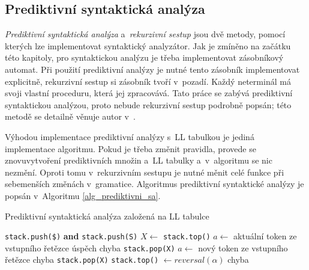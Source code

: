 \subsection*{Prediktivní syntaktická analýza}
\emph{Prediktivní syntaktická analýza} a~\emph{rekurzivní sestup} jsou dvě metody, pomocí kterých lze implementovat syntaktický analyzátor.
Jak je zmíněno na začátku této kapitoly, pro syntaktickou analýzu je třeba implementovat zásobníkový automat.
Při použití prediktivní analýzy je nutné tento zásobník implementovat explicitně, rekurzivní sestup si zásobník tvoří v~pozadí.
Každý neterminál má svoji vlastní proceduru, která jej zpracovává.
Tato práce se zabývá prediktivní syntaktickou analýzou, proto nebude rekurzivní sestup podrobně popsán; této metodě se detailně věnuje autor v~\cite{medunaElementsOfCompDesign}.

Výhodou implementace prediktivní analýzy s~LL tabulkou je jediná implementace algoritmu.
Pokud je třeba změnit pravidla, provede se znovuvytvoření prediktivních množin a~LL tabulky a~v~algoritmu se nic nezmění.
Oproti tomu v~rekurzivním sestupu je nutné měnit celé funkce při sebemenších změnách v~gramatice.
Algoritmus prediktivní syntaktické analýzy je popsán v~Algoritmu \ref{alg_prediktivni_sa}.
\begin{algorithm}[h!]
    \caption{Prediktivní syntaktická analýza založená na LL tabulce}
    \label{alg_prediktivni_sa}
    \begin{algorithmic}[1]
        \NewLine
        \State \texttt{stack.push(\$)} \textbf{and} \texttt{stack.push(S)}
        \Repeat
            \State $X \gets$ \texttt{stack.top()}
            \State $a \gets$ aktuální token ze vstupního řetězce
                \Case{\$}
                        \State úspěch
                    \Else 
                        \State chyba
                    \EndIf
                \EndCase
                        \State \texttt{stack.pop(X)}
                        \State $a \gets$ nový token ze vstupního řetězce
                    \Else
                        \State chyba
                    \EndIf
                \EndCase
                        \State \texttt{stack.pop(X)}
                        \State \texttt{stack.top()} $\gets reversal(\alpha)$
                    \Else
                        \State chyba
                    \EndIf
                \EndCase
            \EndSwitch                
    \end{algorithmic}
\end{algorithm}

